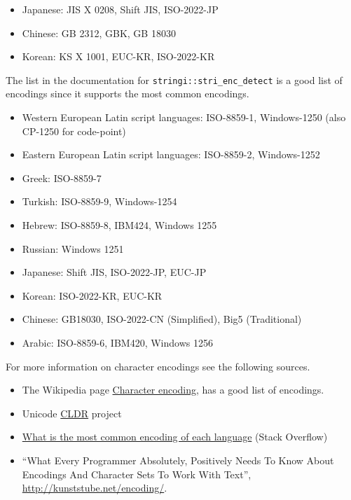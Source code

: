 \documentclass[]{book}
\providecommand{\tightlist}{%
  \setlength{\itemsep}{0pt}\setlength{\parskip}{0pt}}
\theoremstyle{plain}
\theoremstyle{remark}
\theoremstyle{definition}
\theoremstyle{definition}
\theoremstyle{definition}
\theoremstyle{remark}
\begin{document}
\begin{itemize}
\tightlist
\item
  Japanese: JIS X 0208, Shift JIS, ISO-2022-JP
\item
  Chinese: GB 2312, GBK, GB 18030
\item
  Korean: KS X 1001, EUC-KR, ISO-2022-KR
\end{itemize}

The list in the documentation for \texttt{stringi::stri\_enc\_detect} is
a good list of encodings since it supports the most common encodings.

\begin{itemize}
\tightlist
\item
  Western European Latin script languages: ISO-8859-1, Windows-1250
  (also CP-1250 for code-point)
\item
  Eastern European Latin script languages: ISO-8859-2, Windows-1252
\item
  Greek: ISO-8859-7
\item
  Turkish: ISO-8859-9, Windows-1254
\item
  Hebrew: ISO-8859-8, IBM424, Windows 1255
\item
  Russian: Windows 1251
\item
  Japanese: Shift JIS, ISO-2022-JP, EUC-JP
\item
  Korean: ISO-2022-KR, EUC-KR
\item
  Chinese: GB18030, ISO-2022-CN (Simplified), Big5 (Traditional)
\item
  Arabic: ISO-8859-6, IBM420, Windows 1256
\end{itemize}

For more information on character encodings see the following sources.

\begin{itemize}
\tightlist
\item
  The Wikipedia page
  \href{https://en.wikipedia.org/wiki/Character_encoding}{Character
  encoding}, has a good list of encodings.
\item
  Unicode \href{http://cldr.unicode.org/}{CLDR} project
\item
  \href{http://stackoverflow.com/questions/8509339/what-is-the-most-common-encoding-of-each-language}{What
  is the most common encoding of each language} (Stack Overflow)
\item
  ``What Every Programmer Absolutely, Positively Needs To Know About
  Encodings And Character Sets To Work With Text'',
  \url{http://kunststube.net/encoding/}.
\end{itemize}
\end{document}

